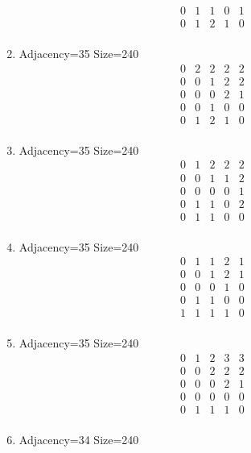 \documentclass[12pt]{article}
\begin{document}
\begin{multicols}{3}
\begin{enumerate}
\begin{equation*}
\begin{array}{ccccc}
0&1&1&0&1\\
0&1&2&1&0\\
\end{array}
\end{equation*}
\item Adjacency=35 Size=240
\begin{equation*}
\begin{array}{ccccc}
0&2&2&2&2\\
0&0&1&2&2\\
0&0&0&2&1\\
0&0&1&0&0\\
0&1&2&1&0\\
\end{array}
\end{equation*}
\item Adjacency=35 Size=240
\begin{equation*}
\begin{array}{ccccc}
0&1&2&2&2\\
0&0&1&1&2\\
0&0&0&0&1\\
0&1&1&0&2\\
0&1&1&0&0\\
\end{array}
\end{equation*}
\item Adjacency=35 Size=240
\begin{equation*}
\begin{array}{ccccc}
0&1&1&2&1\\
0&0&1&2&1\\
0&0&0&1&0\\
0&1&1&0&0\\
1&1&1&1&0\\
\end{array}
\end{equation*}
\item Adjacency=35 Size=240
\begin{equation*}
\begin{array}{ccccc}
0&1&2&3&3\\
0&0&2&2&2\\
0&0&0&2&1\\
0&0&0&0&0\\
0&1&1&1&0\\
\end{array}
\end{equation*}
\item Adjacency=34 Size=240
\begin{equation*}
\begin{array}{ccccc}

\end{array}
\end{equation*}
\end{enumerate}
\end{multicols}
\end{document}
